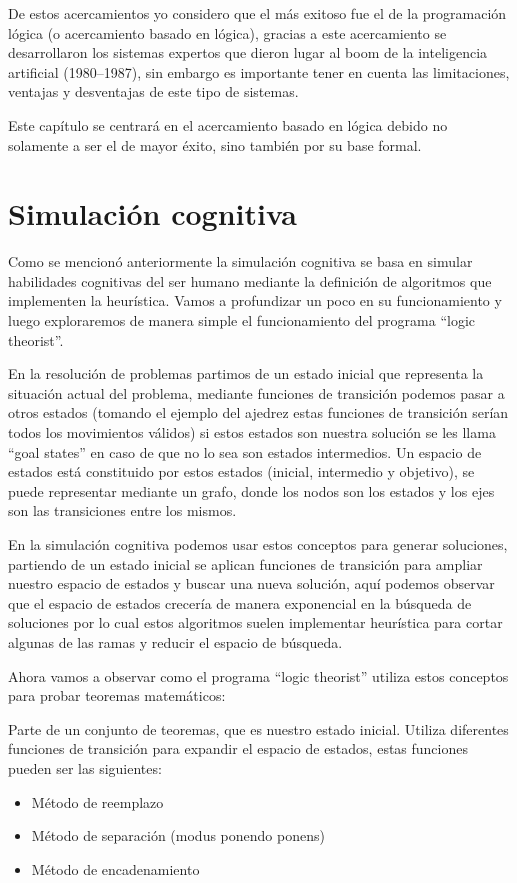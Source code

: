 \documentclass[11pt,fleqn]{book} %
\begin{document}
De estos acercamientos yo considero que el más exitoso fue el de la programación lógica (o acercamiento basado en lógica), gracias a este acercamiento se desarrollaron los sistemas expertos que dieron lugar al boom de la inteligencia artificial (1980–1987), sin embargo es importante tener en cuenta las limitaciones, ventajas y desventajas de este tipo de sistemas.

Este capítulo se centrará en el acercamiento basado en lógica debido no solamente a ser el de mayor éxito, sino también por su base formal. 

\section{Simulación cognitiva} 

Como se mencionó anteriormente la simulación cognitiva se basa en simular habilidades cognitivas del ser humano mediante la definición de algoritmos que implementen la heurística. Vamos a profundizar un poco en su funcionamiento y luego exploraremos de manera simple el funcionamiento del programa “logic theorist”.

En la resolución de problemas partimos de un estado inicial que representa la situación actual del problema, mediante funciones de transición podemos pasar a otros estados (tomando el ejemplo del ajedrez estas funciones de transición serían todos los movimientos válidos) si estos estados son nuestra solución se les llama “goal states” en caso de que no lo sea son estados intermedios. Un espacio de estados está constituido por estos estados (inicial, intermedio y objetivo), se puede representar mediante un grafo, donde los nodos son los estados y los ejes son las transiciones entre los mismos.

En la simulación cognitiva podemos usar estos conceptos para generar soluciones, partiendo de un estado inicial se aplican funciones de transición para ampliar nuestro espacio de estados y buscar una nueva solución, aquí podemos observar que el espacio de estados crecería de manera exponencial en la búsqueda de soluciones por lo cual estos algoritmos suelen implementar heurística para cortar algunas de las ramas y reducir el espacio de búsqueda.

Ahora vamos a observar como el programa “logic theorist” utiliza estos conceptos para probar teoremas matemáticos:

Parte de un conjunto de teoremas, que es nuestro estado inicial.
Utiliza diferentes funciones de transición para expandir el espacio de estados, estas funciones pueden ser las siguientes:
\begin{itemize}
\item Método de reemplazo
\item Método de separación (modus ponendo ponens)
\item Método de encadenamiento
\end{itemize}
\end{document}
